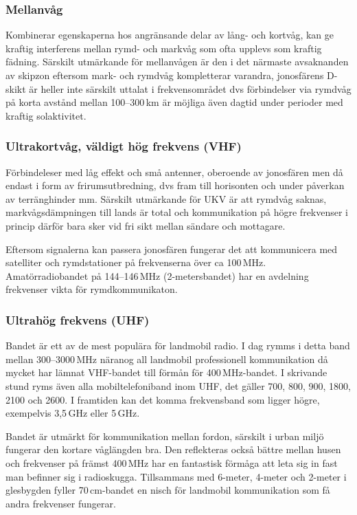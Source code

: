 \subsubsection{Mellanvåg}

Kombinerar egenskaperna hos angränsande delar av lång- och kortvåg, kan ge kraftig interferens mellan rymd- och markvåg som ofta upplevs som kraftig fädning. Särskilt utmärkande för mellanvågen är den i det närmaste avsaknanden av skipzon eftersom mark- och rymdvåg kompletterar varandra, jonosfärens D-skikt är heller inte särskilt uttalat i frekvensområdet dvs förbindelser via rymdvåg på korta avstånd mellan 100--300\,km är möjliga även dagtid under perioder med kraftig solaktivitet.

\subsubsection{Ultrakortvåg, väldigt hög frekvens (VHF)}

Förbindeleser med låg effekt och små antenner, oberoende av jonosfären men då endast i form av frirumsutbredning, dvs fram till horisonten och under påverkan av terränghinder mm. Särskilt utmärkande för UKV är att rymdvåg saknas, markvågsdämpningen till lands är total och kommunikation på högre frekvenser i princip därför bara sker vid fri sikt mellan sändare och mottagare.

Eftersom signalerna kan passera jonosfären fungerar det att kommunicera med satelliter och rymdstationer på frekvenserna över ca 100\,MHz. Amatörradiobandet på 144--146\,MHz (2-metersbandet) har en avdelning frekvenser vikta för rymdkommunikaton.

\subsubsection{Ultrahög frekvens (UHF)}

Bandet är ett av de mest populära för landmobil radio. I dag rymms i detta band mellan 300--3000\,MHz näranog all landmobil professionell kommunikation då mycket har lämnat VHF-bandet till förmån för 400\,MHz-bandet. I skrivande stund ryms även alla mobiltelefoniband inom UHF, det gäller 700, 800, 900, 1800, 2100 och 2600. I framtiden kan det komma frekvensband som ligger högre, exempelvis 3,5\,GHz eller 5\,GHz.

Bandet är utmärkt för kommunikation mellan fordon, särskilt i urban miljö fungerar den kortare våglängden bra. Den reflekteras också bättre mellan husen och frekvenser på främst 400\,MHz har en fantastisk förmåga att leta sig in fast man befinner sig i radioskugga. Tillsammans med 6-meter, 4-meter och 2-meter i glesbygden fyller 70\,cm-bandet en nisch för landmobil kommunikation som få andra frekvenser fungerar.

